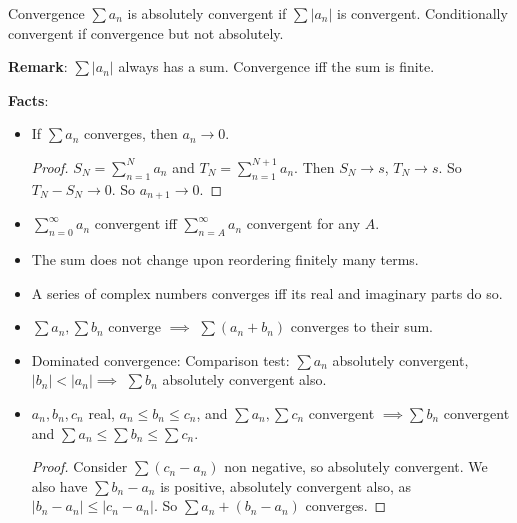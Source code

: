 \documentclass{report}
\begin{document}
\begin{definition}{Convergence}
    $\sum a_{n}$ is absolutely convergent if $\sum \lvert a_{n} \rvert$ is convergent. Conditionally convergent if convergence but not absolutely.
\end{definition}

\textbf{Remark}: $\sum \lvert a_{n} \rvert$ always has a sum. Convergence iff the sum is finite.

\textbf{Facts}:
    \begin{itemize}
        \item If $\sum a_{n}$ converges, then $a_{n} \rightarrow 0$. 
            \begin{proof}
                $S_{N} = \sum_{n = 1}^{N} a_{n}$ and $T_{N} = \sum_{n = 1}^{N + 1}a_{n}$. Then $S_{N} \rightarrow s$, $T_{N} \rightarrow s$. So $T_{N} - S_{N} \rightarrow 0 $. So $a_{n + 1} \rightarrow 0$. 
            \end{proof}

        \item $\sum_{n = 0}^{\infty} a_{n}$ convergent iff $\sum_{n = A}^{\infty} a_{n}$ convergent for any $A$.

        \item The sum does not change upon reordering finitely many terms. 

        \item A series of complex numbers converges iff its real and imaginary parts do so. 

        \item $\sum a_{n}, \sum b_{n}$ converge $\implies$ $\sum (a_{n} + b_{n})$ converges to their sum. 

        \item Dominated convergence: Comparison test: $\sum a_{n}$ absolutely convergent, $\lvert b_{n} \rvert < \lvert a_{n} \rvert \implies$ $\sum b_{n}$ absolutely convergent also.

        \item $a_{n}, b_{n}, c_{n}$ real, $a_{n} \leq b_{n} \leq c_{n}$, and $\sum a_{n}, \sum c_{n}$ convergent $\implies \sum b_{n}$ convergent and $\sum a_{n} \leq \sum b_{n} \leq \sum c_{n}$.
            \begin{proof}
                Consider $\sum (c_{n} - a_{n})$ non negative, so absolutely convergent. We also have $\sum b_{n} - a_{n}$ is positive, absolutely convergent also, as $\lvert b_{n} - a_{n} \rvert \leq \lvert c_{n} - a_{n} \rvert$. So $\sum a_{n} + (b_{n} - a_{n})$ converges.
            \end{proof}
    \end{itemize}
\end{document}
